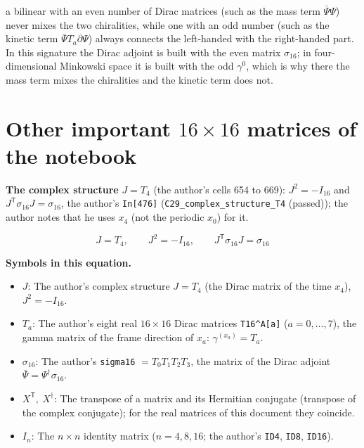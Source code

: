 \documentclass[
  10pt,
]{article}
\providecommand{\tightlist}{%
  \setlength{\itemsep}{0pt}\setlength{\parskip}{0pt}}
\begin{document}
a bilinear with an even number of Dirac matrices (such as the mass term
\(\bar\Psi\Psi\)) never mixes the two chiralities, while one with an odd
number (such as the kinetic term \(\bar\Psi T_a\partial\Psi\)) always
connects the left-handed with the right-handed part. In this signature
the Dirac adjoint is built with the even matrix \(\sigma_{16}\); in
four-dimensional Minkowski space it is built with the odd \(\gamma^0\),
which is why there the mass term mixes the chiralities and the kinetic
term does not.

\hypertarget{other-important-16-times-16-matrices-of-the-notebook}{%
\section{\texorpdfstring{Other important \(16 \times 16\) matrices of
the
notebook}{Other important 16 \textbackslash times 16 matrices of the notebook}}\label{other-important-16-times-16-matrices-of-the-notebook}}

\textbf{The complex structure} \(J = T_4\) (the author's cells 654 to
669): \(J^2 = -I_{16}\) and \(J^{\mathsf T}\sigma_{16}J = \sigma_{16}\),
the author's \texttt{In{[}476{]}} (\texttt{C29\_complex\_structure\_T4}
(passed)); the author notes that he uses \(x_4\) (not the periodic
\(x_0\)) for it.

\[
J = T_4,\qquad J^2 = -I_{16},\qquad J^{\mathsf T}\sigma_{16}J = \sigma_{16}
\]

\textbf{Symbols in this equation.}

\begin{itemize}
\tightlist
\item
  \(J\): The author's complex structure \(J = T_4\) (the Dirac matrix of
  the time \(x_4\)), \(J^2 = -I_{16}\).
\item
  \(T_a\): The author's eight real \(16 \times 16\) Dirac matrices
  \texttt{T16\^{}A{[}a{]}} (\(a = 0, \dots, 7\)), the gamma matrix of
  the frame direction of \(x_a\): \(\gamma^{(x_a)} = T_a\).
\item
  \(\sigma_{16}\): The author's \texttt{sigma16} \(= T_0 T_1 T_2 T_3\),
  the matrix of the Dirac adjoint
  \(\bar\Psi = \Psi^\dagger\sigma_{16}\).
\item
  \(X^{\mathsf T},\ X^\dagger\): The transpose of a matrix and its
  Hermitian conjugate (transpose of the complex conjugate); for the real
  matrices of this document they coincide.
\item
  \(I_n\): The \(n \times n\) identity matrix (\(n = 4, 8, 16\); the
  author's \texttt{ID4}, \texttt{ID8}, \texttt{ID16}).
\end{itemize}
\end{document}
